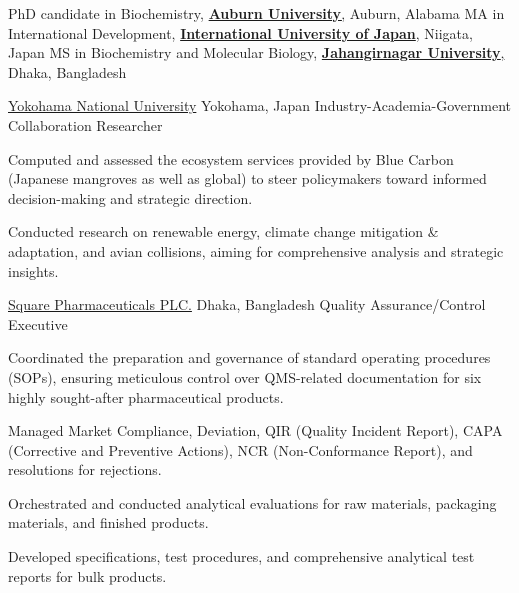 \documentclass[10pt]{article}
\begin{document}
\spacedhrule{0.8ex}{0.0ex}

\headedsubsection
{{{PhD candidate in Biochemistry,}} {\href{https://www.auburn.edu/}{\textbf{Auburn University},} {Auburn, Alabama}}}
{}
{\vspace{-2.4ex}
}
\headedsubsection
{{MA in International Development,} {\href{https://www.iuj.ac.jp/}{\textbf{International University of Japan},} {Niigata, Japan}}}
{}
{\vspace{-2.4ex}
}
\headedsubsection
{{MS in Biochemistry and Molecular Biology,} {\href{https://juniv.edu/}{\textbf{Jahangirnagar University},} {Dhaka, Bangladesh}}}
{}
{\vspace{-2.4ex}
}

\spacedhrule{0.8ex}{0.0ex}

\headedsection
{\href{https://www.ynu.ac.jp/english/}{Yokohama National University}}
{Yokohama, Japan}
{Industry-Academia-Government Collaboration Researcher}
{}
{\vspace{-2.4ex}
	\begin{circlist}
	\item Computed and assessed the ecosystem services provided by Blue Carbon (Japanese mangroves as well as global) to steer policymakers toward informed decision-making and strategic direction.	
    \item Conducted research on renewable energy, climate change mitigation \& adaptation, and avian collisions, aiming for comprehensive analysis and strategic insights.
	\end{circlist}
}

\headedsection
{\href{https://www.squarepharma.com.bd/}{Square Pharmaceuticals PLC.}}
{Dhaka, Bangladesh}
{Quality Assurance/Control Executive}
{}{
\vspace{-2.4ex}
\begin{circlist}	
    \item Coordinated the preparation and governance of standard operating procedures (SOPs), ensuring meticulous control over QMS-related documentation for six highly sought-after pharmaceutical products.
    \item Managed Market Compliance, Deviation, QIR (Quality Incident Report), CAPA (Corrective and Preventive Actions), NCR (Non-Conformance Report), and resolutions for rejections.
    \item Orchestrated and conducted analytical evaluations for raw materials, packaging materials, and finished products.
    \item Developed specifications, test procedures, and comprehensive analytical test reports for bulk products.
\end{circlist}
}
\end{document}
